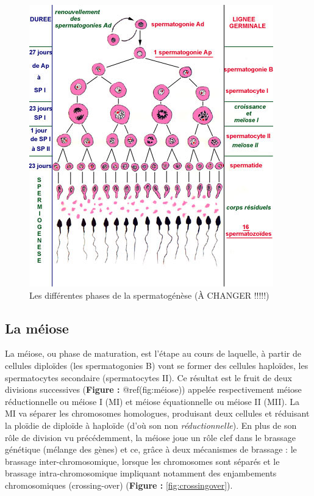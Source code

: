 \documentclass[12pt,twoside]{reedthesis}
\theoremstyle{definition}
\theoremstyle{definition}
\theoremstyle{remark}
\begin{document}
  \begin{figure}
  
  {\centering \includegraphics[scale=0.75]{figure/spermatogenese} 
  
  }
  
  \caption{Les différentes phases de la spermatogénèse (À CHANGER !!!!!)}\label{fig:spermatogenese}
  \end{figure}
  
  \subsection{La méiose}\label{la-meiose}
  
  La méiose, ou phase de maturation, est l'étape au cours de laquelle, à
  partir de cellules diploïdes (les spermatogonies B) vont se former des
  cellules haploïdes, les spermatocytes secondaire (spermatocytes II). Ce
  résultat est le fruit de deux divisions successives (\textbf{Figure :
  }@ref(fig:méiose)) appelée respectivement méiose réductionnelle ou
  méiose I (MI) et méiose équationnelle ou méiose II (MII). La MI va
  séparer les chromosomes homologues, produisant deux cellules et
  réduisant la ploïdie de diploïde à haploïde (d'où son non
  \emph{réductionnelle}). En plus de son rôle de division vu précédemment,
  la méiose joue un rôle clef dans le brassage génétique (mélange des
  gènes) et ce, grâce à deux mécanismes de brassage : le brassage
  inter-chromosomique, lorsque les chromosomes sont séparés et le brassage
  intra-chromosomique impliquant notamment des enjambements chromosomiques
  (crossing-over) (\textbf{Figure : }\ref{fig:crossingover}).
  
\end{document}
